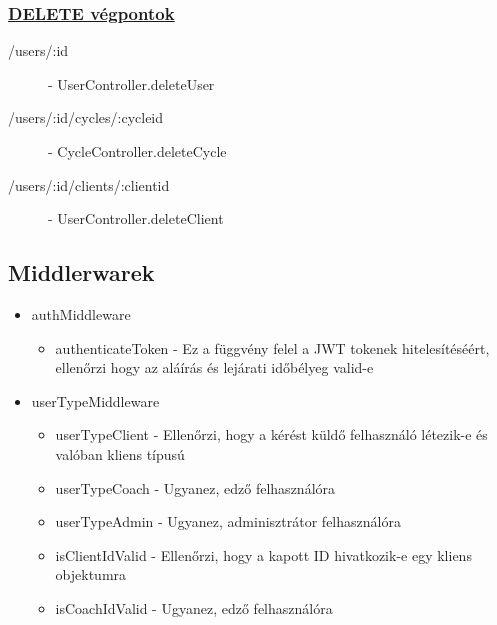 \subsubsection{\underline{DELETE végpontok}}

\begin{description}
	\item[/users/:id] - UserController.deleteUser
	\item[/users/:id/cycles/:cycleid] - CycleController.deleteCycle
	\item[/users/:id/clients/:clientid] - UserController.deleteClient
\end{description}


\subsection{Middlerwarek}

\begin{itemize}
	\item authMiddleware
	\begin{itemize}
		\item authenticateToken - Ez a függvény felel a JWT tokenek hitelesítéséért, ellenőrzi hogy az aláírás és lejárati időbélyeg valid-e
	\end{itemize}
	\item userTypeMiddleware
	\begin{itemize}
		\item userTypeClient - Ellenőrzi, hogy a kérést küldő felhasználó létezik-e és valóban kliens típusú
		\item userTypeCoach - Ugyanez, edző felhasználóra
		\item userTypeAdmin - Ugyanez, adminisztrátor felhasználóra
		\item isClientIdValid - Ellenőrzi, hogy a kapott ID hivatkozik-e egy kliens objektumra
		\item isCoachIdValid - Ugyanez, edző felhasználóra
	\end{itemize}
\end{itemize}